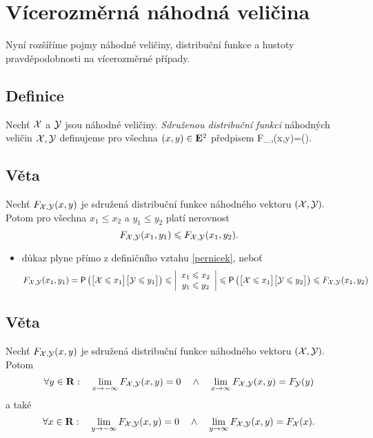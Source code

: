 \section{V\'icerozm\v ern\'a n\'ahodn\'a veli\v cina}

Nyn\'i roz\v s\'i\v r\'ime pojmy n\'ahodn\'e veli\v ciny, distribu\v cn\'i funkce a hustoty pravd\v epodobnosti na v\'icerozm\v ern\'e p\v r\'ipady.

\subsection{Definice}

Nech\v t ${\mathcal X}$ a ${\mathcal Y}$ jsou n\'ahodn\'e veli\v ciny. \emph{Sdru\v zenou distribu\v cn\'i funkci} n\'ahodn\'ych veli\v cin ${\mathcal X},{\mathcal Y}$ definujeme pro v\v sechna $(x,y)\in{\mathbf E}^2$ p\v redpisem
%
\BE F_{\X,\Y}(x,y)=\prob\left(\right). \label{pernicek}\EE

\subsection{Věta}

Nech\v t $F_{{\mathcal X},{\mathcal Y}}(x,y)$ je sdru\v zen\'a distribu\v cn\'i funkce n\'ahodn\'eho vektoru $({\mathcal X},{\mathcal Y}).$ Potom pro v\v sechna $x_1 \leq x_2$ a $y_1 \leq y_2$ plat\'i nerovnost $$F_{{\mathcal X},{\mathcal Y}}(x_1,y_1) \leqslant F_{{\mathcal X},{\mathcal Y}}(x_1,y_2).$$

\Proof

\begin{itemize}
\item d\r ukaz plyne p\v r\'imo z defini\v cn\'iho vztahu \eqref{pernicek}, nebo\v t
%
 $$F_{{\mathcal X},{\mathcal Y}}(x_1,y_1)=\mbox{\sf P}\left(\bigl[{\mathcal X} \leqslant x_1\bigr]\bigl[{\mathcal Y} \leqslant y_1\bigr]\right) \leqslant \left|\begin{array}{c} x_1 \leqslant x_2\\ y_1 \leqslant y_2 \end{array}\right|\leqslant  \mbox{\sf P}\left(\bigl[{\mathcal X} \leqslant x_1\bigr]\bigl[{\mathcal Y} \leqslant y_2\bigr]\right) \leqslant F_{{\mathcal X},{\mathcal Y}}(x_1,y_2)$$
\end{itemize}

\subsection{V\v eta}

Nech\v t $F_{{\mathcal X},{\mathcal Y}}(x,y)$ je sdru\v zen\'a distribu\v cn\'i funkce n\'ahodn\'eho vektoru $({\mathcal X},{\mathcal Y}).$ Potom $$\forall y\in{\mathbf R}: \quad \lim_{x\rightarrow -\infty} F_{{\mathcal X},{\mathcal Y}}(x,y)=0 \quad \wedge \quad \lim_{x\rightarrow \infty} F_{{\mathcal X},{\mathcal Y}}(x,y)=F_{{\mathcal Y}}(y)$$
%
a tak\'e
%
$$\forall x\in{\mathbf R}:  \quad \lim_{y\rightarrow -\infty} F_{{\mathcal X},{\mathcal Y}}(x,y)=0\quad \wedge \quad \lim_{y\rightarrow \infty} F_{{\mathcal X},{\mathcal Y}}(x,y)=F_{{\mathcal X}}(x).$$

